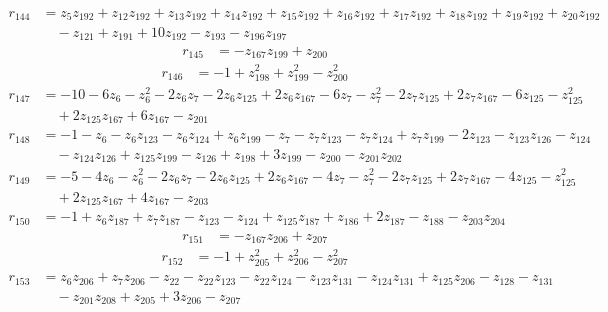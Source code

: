 \begin{align*}
r_{144} &= z_{5}z_{192} + z_{12}z_{192} + z_{13}z_{192} + z_{14}z_{192} + z_{15}z_{192} + z_{16}z_{192} + z_{17}z_{192} + z_{18}z_{192} + z_{19}z_{192} + z_{20}z_{192} \\
&\quad  - z_{121} + z_{191} + 10z_{192} - z_{193} - z_{196}z_{197}
\end{align*}
\begin{align*}
r_{145} &= -z_{167}z_{199} + z_{200}
\end{align*}
\begin{align*}
r_{146} &= -1 + z_{198}^{2} + z_{199}^{2} - z_{200}^{2}
\end{align*}
\begin{align*}
r_{147} &= -10 - 6z_{6} - z_{6}^{2} - 2z_{6}z_{7} - 2z_{6}z_{125} + 2z_{6}z_{167} - 6z_{7} - z_{7}^{2} - 2z_{7}z_{125} + 2z_{7}z_{167} - 6z_{125} - z_{125}^{2} \\
&\quad  + 2z_{125}z_{167} + 6z_{167} - z_{201}
\end{align*}
\begin{align*}
r_{148} &= -1 - z_{6} - z_{6}z_{123} - z_{6}z_{124} + z_{6}z_{199} - z_{7} - z_{7}z_{123} - z_{7}z_{124} + z_{7}z_{199} - 2z_{123} - z_{123}z_{126} - z_{124} \\
&\quad  - z_{124}z_{126} + z_{125}z_{199} - z_{126} + z_{198} + 3z_{199} - z_{200} - z_{201}z_{202}
\end{align*}
\begin{align*}
r_{149} &= -5 - 4z_{6} - z_{6}^{2} - 2z_{6}z_{7} - 2z_{6}z_{125} + 2z_{6}z_{167} - 4z_{7} - z_{7}^{2} - 2z_{7}z_{125} + 2z_{7}z_{167} - 4z_{125} - z_{125}^{2} \\
&\quad  + 2z_{125}z_{167} + 4z_{167} - z_{203}
\end{align*}
\begin{align*}
r_{150} &= -1 + z_{6}z_{187} + z_{7}z_{187} - z_{123} - z_{124} + z_{125}z_{187} + z_{186} + 2z_{187} - z_{188} - z_{203}z_{204}
\end{align*}
\begin{align*}
r_{151} &= -z_{167}z_{206} + z_{207}
\end{align*}
\begin{align*}
r_{152} &= -1 + z_{205}^{2} + z_{206}^{2} - z_{207}^{2}
\end{align*}
\begin{align*}
r_{153} &= z_{6}z_{206} + z_{7}z_{206} - z_{22} - z_{22}z_{123} - z_{22}z_{124} - z_{123}z_{131} - z_{124}z_{131} + z_{125}z_{206} - z_{128} - z_{131} \\
&\quad  - z_{201}z_{208} + z_{205} + 3z_{206} - z_{207}
\end{align*}

